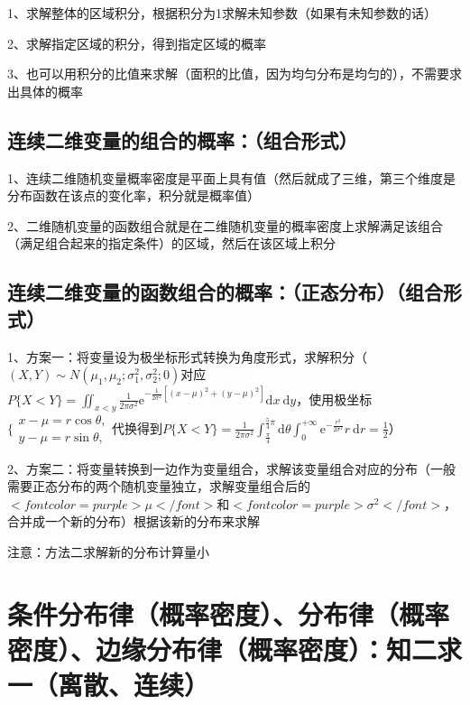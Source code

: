 1、求解整体的区域积分，根据积分为1求解未知参数（如果有未知参数的话）

2、求解指定区域的积分，得到指定区域的概率

3、也可以用积分的比值来求解（面积的比值，因为均匀分布是均匀的），不需要求出具体的概率



\subsection{连续二维变量的组合的概率：（组合形式）}

1、连续二维随机变量概率密度是平面上具有值（然后就成了三维，第三个维度是分布函数在该点的变化率，积分就是概率值）

2、二维随机变量的函数组合就是在二维随机变量的概率密度上求解满足该组合（满足组合起来的指定条件）的区域，然后在该区域上积分



\subsection{连续二维变量的函数组合的概率：（正态分布）（组合形式）}

1、方案一：将变量设为极坐标形式转换为角度形式，求解积分（$ (X, Y) \sim N\left(\mu_{1}, \mu_{2} ; \sigma_{1}^{2}, \sigma_{2}^{2} ; 0\right) $对应$ P\{X<Y\}=\iint_{x<y} \frac{1}{2 \pi \sigma^{2}} \mathrm{e}^{-\frac{1}{2 \sigma^{2}}\left[(x-\mu)^{2}+(y-\mu)^{2}\right]} \mathrm{d} x \mathrm{~d} y $，使用极坐标$ \{\begin{array}{l}x-\mu=r \cos \theta, \\ y-\mu=r \sin \theta,\end{array} $代换得到$ P\{X<Y\}=\frac{1}{2 \pi \sigma^{2}} \int_{\frac{\pi}{4}}^{\frac{5}{4} \pi} \mathrm{d} \theta \int_{0}^{+\infty} \mathrm{e}^{-\frac{r^{2}}{2 \sigma^{2}}} r \mathrm{~d} r=\frac{1}{2} $）

2、方案二：将变量转换到一边作为变量组合，求解该变量组合对应的分布（一般需要正态分布的两个随机变量独立，求解变量组合后的$ <font color=purple>\mu</font> $和$ <font color=purple>\sigma^{2}</font> $，合并成一个新的分布）根据该新的分布来求解

注意：方法二求解新的分布计算量小



\section{条件分布律（概率密度）、分布律（概率密度）、边缘分布律（概率密度）：知二求一（离散、连续）}

